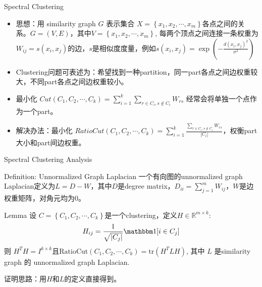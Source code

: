 \begin{frame}{Spectral Clustering}
    \begin{itemize}
        \item 思想：用 similarity graph $G$ 表示集合 $X = \left\{ x_1, x_2, \cdots, x_m \right\}$各点之间的关系。$G=(V, E)$，其中$V=\left\{ x_1, x_2, \cdots, x_m \right\} $, 每两个顶点之间连接一条权重为$W_{ij} = s(x_i, x_j)$的边，$s$是相似度度量，例如$s(x_i, x_j) = \exp\left( - \frac{d(x_i, x_j)^{2}}{\sigma^{2}} \right) $
        \item Clustering问题可表述为：希望找到一种partition，同一part各点之间边权重较大，不同part各点之间边权重较小。
        \item 最小化 $Cut(C_1, C_2, \cdots, C_k) = \sum_{i=1}^{k} \sum_{r \in C_i, s \notin C_i} W_{rs}$ 经常会将单独一个点作为一个part。
        \item 解决办法：最小化 $RatioCut(C_1, C_2, \cdots, C_k) = \sum_{i=1}^{k} \frac{\sum_{r \in C_i, s \notin C_i} W_{rs}}{|C_i|}$，权衡part大小和part间边权重。
    \end{itemize}
\end{frame}

\begin{frame}{Spectral Clustering Analysis}
    \begin{block}{Definition: Unnormalized Graph Laplacian}
        一个有向图的unnormalized graph Laplacian定义为$L = D - W$，其中$D$是degree matrix，$D_{ii} = \sum_{j=1}^{m} W_{ij}$，$W$是边权重矩阵，对角元均为$0$。
    \end{block}
    \begin{block}{Lemma}
        设 $C = \left\{ C_1, C_2, \cdots, C_k \right\} $是一个clustering，定义$H \in \mathbb{R}^{m\times k}$:
        \[
            H_{ij} = \frac{1}{\sqrt{|C_j|}} \mathbbm 1[i \in C_j]
        \]
        则 $H^{T}H = I^{k\times k}$且$\text{RatioCut}(C_1, C_2, \cdots, C_k) = \text{tr}(H^{T}LH)$, 其中 $L$ 是similarity graph 的 unnormalized graph Laplacian.
    \end{block}
    证明思路：用$H$和$L$的定义直接得到。
\end{frame}

